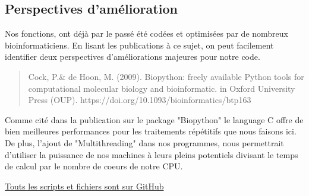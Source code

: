 \documentclass[titlepage]{report}
\begin{document}
\subsection{Perspectives d'amélioration}
\hspace*{1cm}Nos fonctions, ont déjà par le passé été codées et optimisées par de nombreux bioinformaticiens. En lisant les publications à ce sujet, on peut facilement identifier deux perspectives d'améliorations majeures pour notre code.
\begin{quote}
    Cock, P.\& de Hoon, M. (2009). Biopython: freely available Python tools for computational molecular biology and bioinformatic. in  Oxford University Press (OUP). https://doi.org/10.1093/bioinformatics/btp163
\end{quote}
\hspace*{1cm}Comme cité dans la publication sur le package "Biopython" le language C offre de bien meilleures performances pour les traitements répétitifs que nous faisons ici. De plus, l'ajout de "Multithreading" dans nos programmes, nous permettrait d'utiliser la puissance de nos machines à leurs pleins potentiels divisant le temps de calcul par le nombre de coeurs de notre CPU.\\ 
\begin{center}
   \href{https://github.com/SaraSpieler/OBI}{Touts les scripts et fichiers sont sur GitHub}
\end{center}
\end{document}

